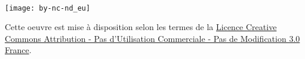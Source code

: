 ~
\vfill 
\begin{center}
	\begin{minipage}[c]{0.25\linewidth}
		\raggedright \texttt{[image: by-nc-nd\_eu]}
	\end{minipage}\hfill
\end{center}

Cette oeuvre est mise à disposition selon les termes de la \href{http://creativecommons.org/licenses/by-nc-nd/3.0/fr/}{Licence Creative Commons Attribution - Pas d’Utilisation Commerciale - Pas de Modification 3.0 France}.